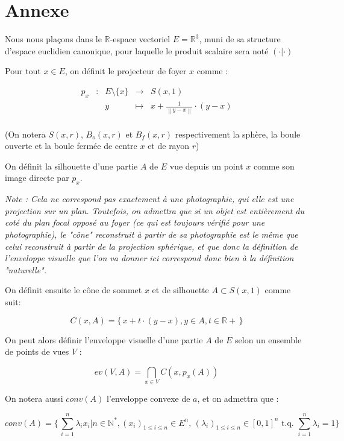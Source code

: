 \documentclass[a4paper]{article}
\newcommand{\norm}[1]{\left\lVert#1\right\rVert}
\begin{document}
  \section{Annexe}\label{AnnexeB}
    Nous nous plaçons dans le $\mathbb{R}$-espace vectoriel $E = \mathbb{R}^{3}$, muni de sa structure d'espace euclidien canonique, pour laquelle le produit scalaire sera noté $(\cdot|\cdot)$


    Pour tout $x\in E$, on définit le projecteur de foyer $x$ comme :

    \[\begin{array}{ccccl}
    p_{x} & : & E\setminus\{x\} & \to & S(x, 1) \\
     & & y & \mapsto & x  + \frac{1}{\norm{y - x}} \cdot (y - x) \\
    \end{array}\]

    (On notera $S(x, r)$, $B_{o}(x, r)$ et $B_{f}(x, r)$ respectivement la sphère, la boule ouverte et la boule fermée de centre $x$ et de rayon $r$)


    On définit la silhouette d'une  partie $A$ de $E$ vue depuis un point $x$ comme son image directe par $p_{x}$.

    \textit{Note : Cela ne correspond pas exactement à une photographie, qui elle est une projection sur un plan. Toutefois, on admettra que si un objet est entièrement du coté du plan focal opposé au foyer (ce qui est toujours vérifié pour une photographie), le "cône" reconstruit à partir de sa photographie est le même que celui reconstruit à partir de la projection sphérique, et que donc la définition de l'enveloppe visuelle que l'on va donner ici correspond donc bien à la définition "naturelle".}

    On définit ensuite le cône de sommet $x$ et de silhouette $A \subset S(x, 1)$ comme suit:

    \[C(x,A) = \{\,x + t\cdot{}(y - x), y\in{}A, t\in\mathbb{R}+\,\}\]

    On peut alors définir l'enveloppe visuelle d'une partie $A$ de $E$ selon un ensemble de points de vues $V$ :

    \[ev(V, A) = \bigcap_{x\in{}V}C(x,p_{x}(A))\]

    On notera aussi $conv(A)$ l'enveloppe convexe de $a$, et on admettra que :

    \[conv(A) = \{\,\sum_{i=1}^{n} \lambda_{i} x_{i}| n\in{}\mathbb{N}^{*}, (x_{i})_{1\leqslant i \leqslant n} \in E^{n}, \, (\lambda_{i})_{1\leqslant i \leqslant n} \in [0, 1]^{n}\text{ t.q. } \sum_{i=1}^{n} \lambda_{i} = 1\}\]
\end{document}
